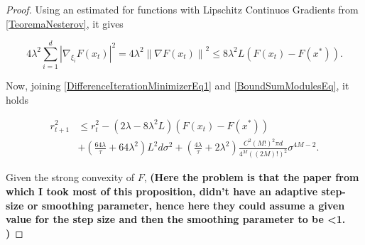 \begin{proof}
Using an estimated for functions with Lipschitz Continuos Gradients from \ref{TeoremaNesterov}, it gives

\begin{equation}\label{BoundSumModulesEq}
 4 \lambda^{2} \sum_{i=1}^{d}\left|\nabla_{\xi_{i}} F\left(x_{t}\right)\right|^{2}=4 \lambda^{2}\left\|\nabla F\left(x_{t}\right)\right\|^{2} \leq 8 \lambda^{2} L\left(F\left(x_{t}\right)-F\left(x^{*}\right)\right) . 
\end{equation}

Now, joining \ref{DifferenceIterationMinimizerEq1} and \ref{BoundSumModulesEq}, it holds

\begin{equation}
 \begin{aligned} 
 r_{t+1}^{2} 
 & \leq r_{t}^{2}-\left(2 \lambda-8 \lambda^{2} L\right)\left(F\left(x_{t}\right)-F\left(x^{*}\right)\right) \\ 
 & +\left(\frac{64 \lambda}{\tau}+64 \lambda^{2}\right) L^{2} d \sigma^{2}+\left(\frac{4 \lambda}{\tau}+2 \lambda^{2}\right) \frac{C^{2}(M !)^{2} \pi d}{4^{M}((2 M) !)^{2}} \sigma^{4 M-2}. 
 \end{aligned} 
\end{equation}

Given the strong convexity of $F$, \textbf{(Here the problem is that the paper from which I took most of this proposition, didn't have an adaptive step-size or smoothing parameter, hence here they could assume a given value for the step size and then the smoothing parameter to be <1. )}

\end{proof}